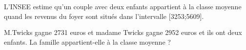 
L'INSEE estime qu'un couple avec deux enfants appartient à la classe moyenne quand les revenus du foyer sont situés dans l'intervalle [3253;5609].

M.Twicks gagne 2731 euros et madame Twicks gagne 2952 euros et ils ont deux enfants. La famille appartient-elle à la classe moyenne ?